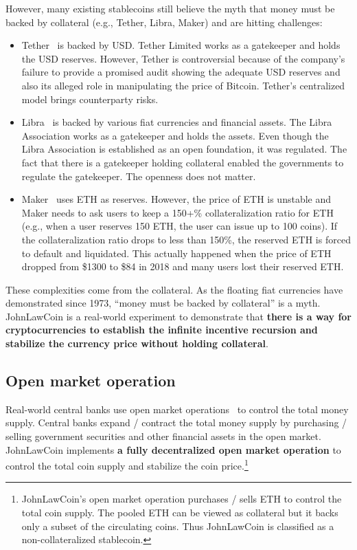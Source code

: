 \documentclass[dvipdfmx,a4paper]{article}
\begin{document}
However, many existing stablecoins still believe the myth that money must be backed by collateral (e.g., Tether, Libra, Maker) and are hitting challenges:

\begin{itemize}
\item Tether~\cite{tether} is backed by USD. Tether Limited works as a gatekeeper and holds the USD reserves. However, Tether is controversial because of the company's failure to provide a promised audit showing the adequate USD reserves and also its alleged role in manipulating the price of Bitcoin. Tether's centralized model brings counterparty risks.
\item Libra~\cite{libra} is backed by various fiat currencies and financial assets. The Libra Association works as a gatekeeper and holds the assets. Even though the Libra Association is established as an open foundation, it was regulated. The fact that there is a gatekeeper holding collateral enabled the governments to regulate the gatekeeper. The openness does not matter.
\item Maker~\cite{makerdao} uses ETH as reserves. However, the price of ETH is unstable and Maker needs to ask users to keep a 150+\% collateralization ratio for ETH (e.g., when a user reserves 150 ETH, the user can issue up to 100 coins). If the collateralization ratio drops to less than 150\%, the reserved ETH is forced to default and liquidated. This actually happened when the price of ETH dropped from \$1300 to \$84 in 2018 and many users lost their reserved ETH.
\end{itemize}

These complexities come from the collateral. As the floating fiat currencies have demonstrated since 1973, ``money must be backed by collateral'' is a myth. JohnLawCoin is a real-world experiment to demonstrate that \textbf{there is a way for cryptocurrencies to establish the infinite incentive recursion and stabilize the currency price without holding collateral}.

\subsection{Open market operation}

Real-world central banks use open market operations~\cite{ayuso2003model} to control the total money supply. Central banks expand / contract the total money supply by purchasing / selling government securities and other financial assets in the open market. JohnLawCoin implements \textbf{a fully decentralized open market operation} to control the total coin supply and stabilize the coin price.\footnote{JohnLawCoin's open market operation purchases / sells ETH to control the total coin supply. The pooled ETH can be viewed as collateral but it backs only a subset of the circulating coins. Thus JohnLawCoin is classified as a non-collateralized stablecoin.}
\end{document}
